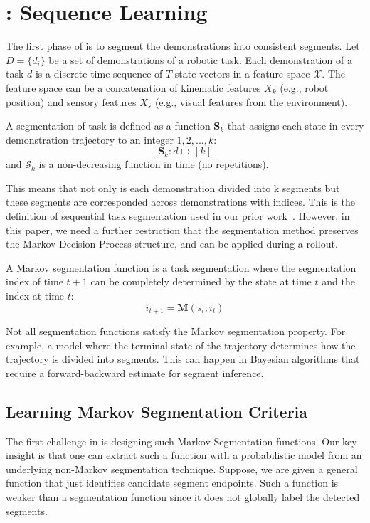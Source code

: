 \section{\hirl: Sequence Learning}
The first phase of \hirl is to segment the demonstrations into consistent segments.
Let $D=\{d_i\}$ be a set of demonstrations of a robotic task.
Each demonstration of a task $d$ is a discrete-time sequence of $T$ state vectors in a feature-space $\mathcal{X}$.
The feature space can be a concatenation of kinematic features $X_{k}$ (e.g., robot position) and sensory features $X_{s}$ (e.g., visual features from the environment).

\begin{definition}[Segmentation]
A segmentation of task is defined as a function $\mathbf{S}_k$ that assigns each state in every demonstration trajectory to an integer $1,2,...,k$:
\[
\mathbf{S}_k: d \mapsto [k]
\]
and $\mathcal{S}_k$ is a non-decreasing function in time (no repetitions).
\end{definition}

This means that not only is each demonstration divided into k segments but these segments are corresponded across demonstrations with indices.
This is the definition of sequential task segmentation used in our prior work~\cite{krishnan2015tsc,murali2016}.
However, in this paper, we need a further restriction that the segmentation method preserves the Markov Decision Process structure, and can be applied during a rollout.

\begin{definition}
A Markov segmentation function is a task segmentation where the segmentation index of time $t+1$ can be completely determined by the state at time $t$ and the index at time $t$:
\[
i_{t+1} = \mathbf{M}(s_t, i_t)  
\]
\end{definition}

Not all segmentation functions satisfy the Markov segmentation property. For example, a model where the terminal state of the trajectory determines how the trajectory is divided into segments.
This can happen in Bayesian algorithms that require a forward-backward estimate for segment inference.

\subsection{Learning Markov Segmentation Criteria}
The first challenge in \hirl is designing such Markov Segmentation functions.
Our key insight is that one can extract such a function with a probabilistic model from an underlying non-Markov segmentation technique.
Suppose, we are given a general function that just identifies candidate segment endpoints.
Such a function is weaker than a segmentation function since it does not globally label the detected segments.

